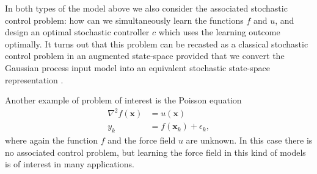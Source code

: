 \documentclass[journal]{IEEEtran}
\newcommand{\simo}[1]{{\color{red}#1}}
\begin{document}
In both types of the model above we also consider the associated stochastic control problem: how can we simultaneously learn the functions $f$ and $u$, and design an optimal stochastic controller $c$ which uses the learning outcome optimally. It turns out that this problem can be recasted as a classical stochastic control problem in an augmented state-space provided that we convert the Gaussian process input model into an equivalent stochastic state-space representation \cite{Hartikainen+Sarkka:2011,Hartikainen+Seppanen+Sarkka:2012}.

Another example of problem of interest is the Poisson equation
%
\begin{equation}
\begin{split}
  \nabla^2 f(\mathbf{x}) &= u(\mathbf{x}) \\
  y_k &= f(\mathbf{x}_k) + \epsilon_k,
\end{split}
\label{eq:sde0}
\end{equation}
%
where again the function $f$ and the force field $u$ are unknown. In this case there is no associated control problem, but learning the force field in this kind of models is of interest in many applications.


\end{document}
